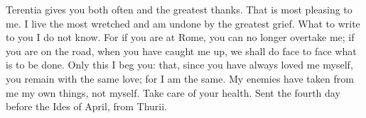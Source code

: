 

Terentia gives you both often and the greatest thanks. That is most pleasing to me. I live the most wretched and am undone by the greatest grief. What to write to you I do not know. For if you are at Rome, you can no longer overtake me; if you are on the road, when you have caught me up, we shall do face to face what is to be done. Only this I beg you: that, since you have always loved me myself, you remain with the same love; for I am the same. My enemies have taken from me my own things, not myself. Take care of your health. Sent the fourth day before the Ides of April, from Thurii.
